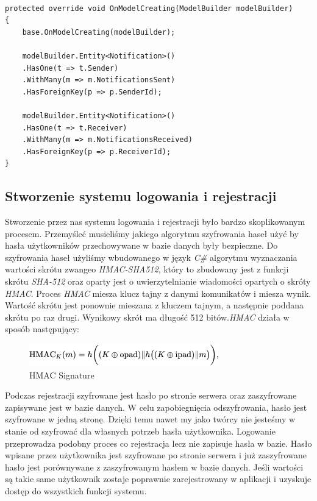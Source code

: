 \documentclass[12pt,a4paper]{article}
\begin{document}
\begin{lstlisting}[caption={OnModelCreating tabela Notyfication - Entity Framework}]

protected override void OnModelCreating(ModelBuilder modelBuilder)
{
	base.OnModelCreating(modelBuilder);
	
	modelBuilder.Entity<Notification>()
	.HasOne(t => t.Sender)
	.WithMany(m => m.NotificationsSent)
	.HasForeignKey(p => p.SenderId);
	
	modelBuilder.Entity<Notification>()
	.HasOne(t => t.Receiver)
	.WithMany(m => m.NotificationsReceived)
	.HasForeignKey(p => p.ReceiverId);
}
\end{lstlisting}

\subsection{Stworzenie systemu logowania i rejestracji}

\hspace*{0.7cm} Stworzenie przez nas systemu logowania i rejestracji było bardzo skoplikowanym procesem. Przemyśleć musieliśmy jakiego algorytmu szyfrowania haseł użyć by hasła użytkowników przechowywane w bazie danych były bezpieczne. Do szyfrowania haseł użyliśmy wbudowanego w język \textit{C\#} algorytmu wyznaczania wartości skrótu zwangeo \textit{HMAC-SHA512}, który to zbudowany jest z funkcji skrótu \textit{SHA-512} oraz oparty jest o uwierzytelnianie wiadomości opartych o skróty \textit{HMAC}. Proces \textit{HMAC} miesza klucz tajny z danymi komunikatów i miesza wynik. Wartość skrótu jest ponownie mieszana z kluczem tajnym, a następnie poddana skrótu po raz drugi. Wynikowy skrót ma długość 512 bitów.\textit{HMAC} działa w sposób następujący:\newline

\begin{figure}[H]
	\centering
	\includegraphics[width=0.7\linewidth]{hmac_signature}
	\caption{HMAC Signature}
	\label{fig:hmac_signature}
\end{figure}

\hspace*{0.7cm} Podczas rejestracji szyfrowane jest hasło po stronie serwera oraz zaszyfrowane zapisywane jest w bazie danych. W celu zapobiegnięcia odszyfrowania, hasło jest szyfrowane w jedną stronę. Dzięki temu nawet my jako twórcy nie jesteśmy w stanie od szyfrować dla własnych potrzeb hasła użytkownika. Logowanie przeprowadza podobny proces co rejestracja lecz nie zapisuje hasła w bazie. Hasło wpisane przez użytkownika jest szyfrowane po stronie serwera i już zaszyfrowane hasło jest porównywane z zaszyfrowanym hasłem w bazie danych. Jeśli wartości są takie same użytkownik zostaje poprawnie zarejestrowany w aplikacji i uzyskuje dostęp do wszystkich funkcji systemu.
\end{document}
